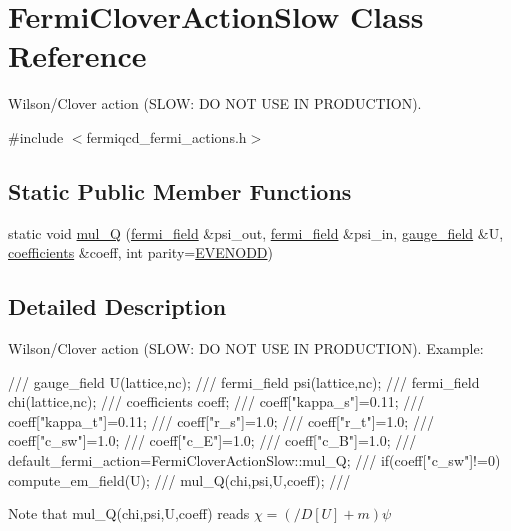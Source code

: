 \hypertarget{class_fermi_clover_action_slow}{
\section{FermiCloverActionSlow Class Reference}
\label{class_fermi_clover_action_slow}
}


Wilson/Clover action (SLOW: DO NOT USE IN PRODUCTION).  


{\ttfamily \#include $<$fermiqcd\_\-fermi\_\-actions.h$>$}\subsection*{Static Public Member Functions}
\begin{DoxyCompactItemize}
\item 
static void \hyperlink{class_fermi_clover_action_slow_a8e9b281981e3907873fc08c52f2c3d21}{mul\_\-Q} (\hyperlink{classfermi__field}{fermi\_\-field} \&psi\_\-out, \hyperlink{classfermi__field}{fermi\_\-field} \&psi\_\-in, \hyperlink{classgauge__field}{gauge\_\-field} \&U, \hyperlink{classcoefficients}{coefficients} \&coeff, int parity=\hyperlink{mdp__global__vars_8h_a4c9de81f2de5a74b588107b6c0afb9ee}{EVENODD})
\end{DoxyCompactItemize}


\subsection{Detailed Description}
Wilson/Clover action (SLOW: DO NOT USE IN PRODUCTION). Example: \begin{DoxyVerb}
/// gauge_field U(lattice,nc);
/// fermi_field psi(lattice,nc);
/// fermi_field chi(lattice,nc);
/// coefficients coeff;
/// coeff["kappa_s"]=0.11;
/// coeff["kappa_t"]=0.11;
/// coeff["r_s"]=1.0;
/// coeff["r_t"]=1.0;
/// coeff["c_{sw}"]=1.0;
/// coeff["c_E"]=1.0;
/// coeff["c_B"]=1.0;
/// default_fermi_action=FermiCloverActionSlow::mul_Q;
/// if(coeff["c_{sw}"]!=0) compute_em_field(U);
/// mul_Q(chi,psi,U,coeff);
/// \end{DoxyVerb}
 Note that mul\_\-Q(chi,psi,U,coeff) reads $ \chi=(/\!\!\!D[U]+m)\psi $ 

